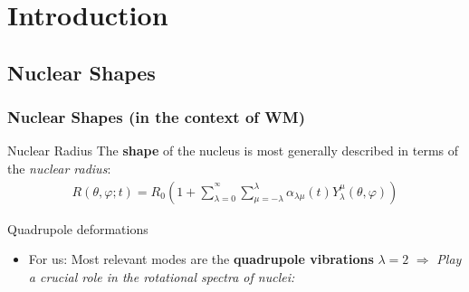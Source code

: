 \documentclass{beamer}
\begin{document}
\section{Introduction}

\subsection{Nuclear Shapes}

\begin{frame}
	\frametitle{Nuclear Shapes (in the context of WM)}
	\begin{exampleblock}{Nuclear Radius}
		The \textbf{shape} of the nucleus is most generally described in terms of the \emph{nuclear radius}:
		\begin{align}
			R(\theta,\varphi;t)=R_0\left(1+\sum_{\lambda=0}^{^\infty}\sum_{\mu=-\lambda}^\lambda\alpha_{\lambda\mu}(t)Y_\lambda^\mu(\theta,\varphi)\right)
		\end{align}
	\end{exampleblock}
	\begin{block}{Quadrupole deformations}

		\begin{itemize}
			\item {\color{red}For us:} Most relevant modes are the \textbf{quadrupole vibrations} $\lambda=2$ $\Longrightarrow$ \emph{Play a crucial role in the rotational spectra of nuclei:}
		\end{itemize}
	\end{block}
\end{frame}
\end{document}
